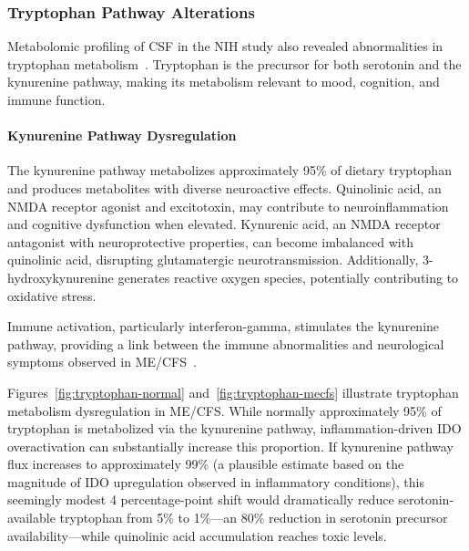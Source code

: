 \subsubsection{Tryptophan Pathway Alterations}

Metabolomic profiling of CSF in the NIH study also revealed abnormalities in tryptophan metabolism~\cite{walitt2024deep}. Tryptophan is the precursor for both serotonin and the kynurenine pathway, making its metabolism relevant to mood, cognition, and immune function.

\paragraph{Kynurenine Pathway Dysregulation}
The kynurenine pathway metabolizes approximately 95\% of dietary tryptophan and produces metabolites with diverse neuroactive effects. Quinolinic acid, an NMDA receptor agonist and excitotoxin, may contribute to neuroinflammation and cognitive dysfunction when elevated. Kynurenic acid, an NMDA receptor antagonist with neuroprotective properties, can become imbalanced with quinolinic acid, disrupting glutamatergic neurotransmission. Additionally, 3-hydroxykynurenine generates reactive oxygen species, potentially contributing to oxidative stress.

Immune activation, particularly interferon-gamma, stimulates the kynurenine pathway, providing a link between the immune abnormalities and neurological symptoms observed in ME/CFS~\cite{Dehhaghi2022kynurenine,Kavyani2022kynurenine}.





Figures~\ref{fig:tryptophan-normal} and~\ref{fig:tryptophan-mecfs} illustrate tryptophan metabolism dysregulation in ME/CFS. While normally approximately 95\% of tryptophan is metabolized via the kynurenine pathway, inflammation-driven IDO overactivation can substantially increase this proportion. If kynurenine pathway flux increases to approximately 99\% (a plausible estimate based on the magnitude of IDO upregulation observed in inflammatory conditions), this seemingly modest 4 percentage-point shift would dramatically reduce serotonin-available tryptophan from 5\% to 1\%---an 80\% reduction in serotonin precursor availability---while quinolinic acid accumulation reaches toxic levels.


